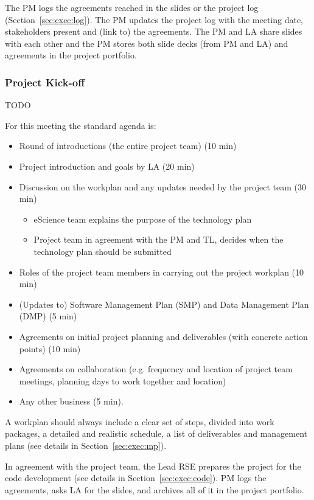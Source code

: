 \documentclass[11pt]{article}
\begin{document}
The PM logs the agreements reached in the slides or the project log (Section~\ref{sec:exec:log}). The PM updates the
project log with the meeting date, stakeholders present and (link to) the agreements. The PM and LA share slides with
each other and the PM stores both slide decks (from PM and LA) and agreements in the project portfolio.

\subsubsection{Project Kick-off}

TODO

For this meeting the standard agenda is:

\begin{itemize}
\item Round of introductions (the entire project team) (10 min)
\item Project introduction and goals by LA (20 min)
\item Discussion on the workplan and any updates needed by the project team (30 min)
\begin{itemize}
\item eScience team explains the purpose of the technology plan
\item Project team in agreement with the PM and TL, decides when the technology plan should be submitted
\end{itemize}
\item Roles of the project team members in carrying out the project workplan (10 min)
\item (Updates to) Software Management Plan (SMP) and Data Management Plan (DMP) (5 min)
\item Agreements on initial project planning and deliverables (with concrete action points) (10 min)
\item Agreements on collaboration (e.g. frequency and location of project team meetings, planning days to work together and
location)
\item Any other business (5 min).
\end{itemize}

A workplan should always include a clear set of steps, divided into work packages, a detailed and realistic schedule, a
list of deliverables and management plans (see details in Section~\ref{sec:exec:mp}).

In agreement with the project team, the Lead RSE prepares the project for the code development (see details in Section~\ref{sec:exec:code}). PM logs the agreements, asks LA for the slides, and archives all of it in the project
portfolio.
\end{document}

